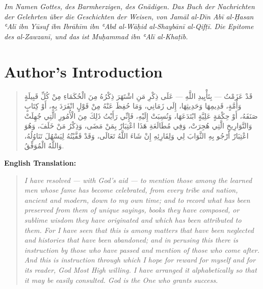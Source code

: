 \documentclass[11pt,a4paper]{article}
\def\RL#1{\beginR#1\endR}
\newcommand{\arabicblock}[1]{{\arabicfont\RL{#1}}}
\begin{document}
\vspace{0.5cm}

\noindent\textit{Im Namen Gottes, des Barmherzigen, des Gnädigen. Das Buch der Nachrichten der Gelehrten über die Geschichten der Weisen, von Jamāl al-Dīn Abī al-Ḥasan ʿAlī ibn Yūsuf ibn Ibrāhīm ibn ʿAbd al-Wāḥid al-Shaybānī al-Qifṭī. Die Epitome des al-Zawzanī, und das ist Muḥammad ibn ʿAlī al-Khaṭīb.}

\newpage

\section{Author's Introduction}
\label{sec:intro}

\begin{quote}
\arabicblock{%
قَدْ عَزَمْتُ — بِتَأْيِيدِ اللَّهِ — عَلَى ذِكْرِ مَنِ اشْتَهَرَ ذِكْرُهُ مِنَ الْحُكَمَاءِ مِنْ كُلِّ قَبِيلَةٍ وَأُمَّةٍ، قَدِيمِهَا وَحَدِيثِهَا، إِلَى زَمَانِي، وَمَا حُفِظَ عَنْهُ مِنْ قَوْلٍ انْفَرَدَ بِهِ، أَوْ كِتَابٍ صَنَفَهُ، أَوْ حِكْمَةٍ عَلِيَّةٍ ابْتَدَعَهَا، وَنُسِبَتْ إِلَيْهِ، فَإِنِّي رَأَيْتُ ذَلِكَ مِنَ الْأُمُورِ الَّتِي جُهِلَتْ وَالتَّوَارِيخِ الَّتِي هُجِرَتْ، وَفِي مُطَالَعَةِ هَذَا اعْتِبَارٌ بِمَنْ مَضَى، وَذِكْرُ مَنْ خَلَفَ، وَهُوَ اعْتِبَارٌ أَرْجُو بِهِ الثَّوَابَ لِي وَلِقَارِئِهِ إِنْ شَاءَ اللَّهُ تَعَالَى، وَقَدْ قَفَّيْتُهُ لِيَسْهُلَ تَنَاوُلُهُ، وَاللَّهُ الْمُوَفِّقُ.%
}
\end{quote}

\vspace{0.5cm}

\noindent\textbf{English Translation:}

\begin{quote}
\textit{I have resolved --- with God's aid --- to mention those among the learned men whose fame has become celebrated, from every tribe and nation, ancient and modern, down to my own time; and to record what has been preserved from them of unique sayings, books they have composed, or sublime wisdom they have originated and which has been attributed to them. For I have seen that this is among matters that have been neglected and histories that have been abandoned; and in perusing this there is instruction by those who have passed and mention of those who come after. And this is instruction through which I hope for reward for myself and for its reader, God Most High willing. I have arranged it alphabetically so that it may be easily consulted. God is the One who grants success.}
\end{quote}
\end{document}
